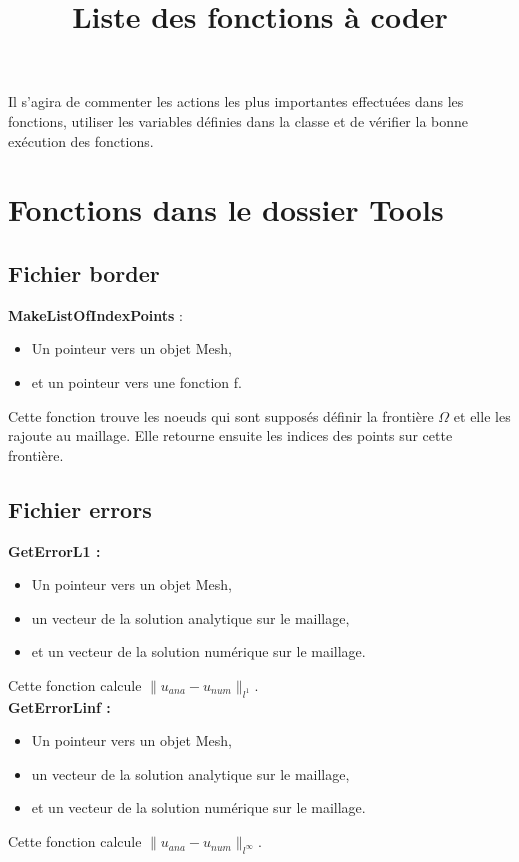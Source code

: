 \documentclass[french]{article}
\newcommand{\elodie}{\hfill{\color{red}{Élodie}}}
\newcommand{\alexis}{\hfill{\color{green}{Alexis}}}
\begin{document}
\title{Liste des fonctions à coder}

\maketitle

Il s'agira de commenter les actions les plus importantes effectuées dans les fonctions, utiliser les variables définies dans la classe et de vérifier la bonne exécution des fonctions.

\section{Fonctions dans le dossier Tools}
\subsection{Fichier border}
\textbf{MakeListOfIndexPoints} :\alexis
\begin{itemize}
\item Un pointeur vers un objet Mesh,
\item et un pointeur vers une fonction f.
\end{itemize}
Cette fonction trouve les noeuds qui sont supposés définir la frontière $\Omega$ et elle les rajoute au maillage. Elle retourne ensuite les indices des points sur cette frontière.

\subsection{Fichier errors}
\textbf{GetErrorL1 :}\elodie
\begin{itemize}
\item Un pointeur vers un objet Mesh,
\item un vecteur de la solution analytique sur le maillage,
\item et un vecteur de la solution numérique sur le maillage.
\end{itemize}
Cette fonction calcule $\|u_{ana} - u_{num}\|_{l^1}$.\\

\textbf{GetErrorLinf :}\elodie
\begin{itemize}
\item Un pointeur vers un objet Mesh,
\item un vecteur de la solution analytique sur le maillage,
\item et un vecteur de la solution numérique sur le maillage.
\end{itemize}
Cette fonction calcule $\|u_{ana} - u_{num}\|_{l^\infty}$.\\
\end{document}

